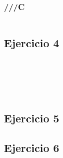 \documentclass[10pt,a4paper]{article}
\begin{document}
\subsubsection{///C}
    \begin{lstlisting}
    \end{lstlisting}
\subsection{Ejercicio 4}
\subsubsection{}
    \begin{lstlisting}
    \end{lstlisting}
\subsubsection{}
    \begin{lstlisting}
    \end{lstlisting}
\subsubsection{}
    \begin{lstlisting}
    \end{lstlisting}
\subsubsection{}
    \begin{lstlisting}
    \end{lstlisting}
\subsection{Ejercicio 5}
\subsection{Ejercicio 6}
\subsubsection{}
    \begin{lstlisting}
    \end{lstlisting}
\subsubsection{}
    \begin{lstlisting}
    \end{lstlisting}
\end{document}
